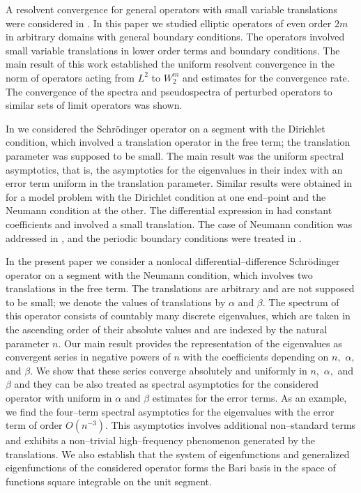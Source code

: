 \documentclass[10pt, a4paper]{article}
\theoremstyle{plain}
\theoremstyle{definition}
\numberwithin{equation}{section}
\def\a{\alpha}
\def\b{\beta}
\begin{document}
A resolvent convergence for general operators with small variable translations were considered
in \cite{Borisov_Polyakov}. In this paper we studied elliptic operators of even order $2m$
in arbitrary domains with general boundary conditions. The operators involved small variable translations in lower order terms and boundary conditions. The main result of this work established the uniform resolvent
convergence in the norm of operators acting from $L^2$ to $W_2^m$ and estimates for the convergence rate. The convergence of the spectra and pseudospectra of perturbed operators to similar sets of limit operators was shown.



In \cite{Borisov_PolyakovDAN} we considered the Schr\"odinger operator on a segment with the Dirichlet condition, which involved a translation operator in the free term; the translation parameter was supposed to be small. The main result was the uniform spectral asymptotics, that is, the asymptotics for the eigenvalues in their index with an error term uniform in the translation parameter. Similar results were obtained in \cite{Borisov_PolyakovUMJ} for a model problem with the Dirichlet condition at one end--point and the Neumann condition at the other. The differential expression in \cite{Borisov_PolyakovUMJ} had constant coefficients and involved a small translation. The case of Neumann condition was addressed in \cite{Borisov_PolyakovIZV}, and the periodic boundary conditions were treated in \cite{RJMP2025}.


In the present paper we consider  a nonlocal differential--difference
Schr\"odinger operator on a segment with the Neumann condition, which involves two
translations in the free term. The translations are arbitrary and are not supposed to be small; we denote the values of translations by $\a$ and $\b.$ The spectrum of this operator consists of countably many discrete eigenvalues, which  are taken in the ascending order of their absolute values and are indexed by the natural parameter $n.$ Our main result provides   the representation of the eigenvalues as convergent series in negative powers of $n$ with the coefficients depending on $n,$ $\a,$ and $\b.$ We show that these series converge absolutely and uniformly in $n,$ $\a,$ and $\b$
and they can be also treated as spectral asymptotics for the considered operator with uniform in $\a$ and $\b$ estimates for the error terms. As an example,  we find the four--term spectral asymptotics for the eigenvalues with the error term of order
$O(n^{-3}).$ This asymptotics involves additional non--standard
terms and exhibits a non--trivial high--frequency phenomenon generated by the translations. We also establish that the system of eigenfunctions and generalized eigenfunctions of the considered operator forms the Bari basis in the space of functions square integrable on the unit segment.
\end{document}
